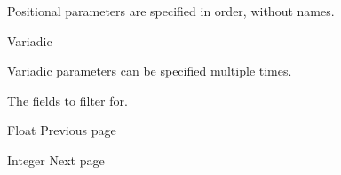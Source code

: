 \label{definitions-where-fields-positional-tooltip}
Positional parameters are specified in order, without names.

{{ Variadic }}

\label{definitions-where-fields-variadic-tooltip}
Variadic parameters can be specified multiple times.

The fields to filter for.

\href{/docs/reference/foundations/float/}{\pandocbounded{}}

{ Float } { Previous page }

\href{/docs/reference/foundations/int/}{\pandocbounded{}}

{ Integer } { Next page }
